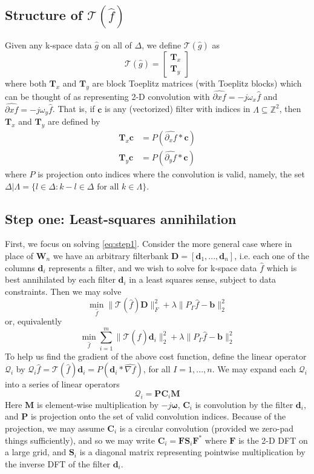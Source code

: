 \documentclass[a4paper]{article}
\begin{document}
\subsection{Structure of $\mathcal{T}(\hat f)$}
Given any k-space data $\hat g$ on all of $\Delta$, we define $\mathcal{T}(\hat g)$ as
\[
\mathcal{T}(\hat g) = \begin{bmatrix}\mathbf T_x \\ \mathbf T_y\end{bmatrix}
\]
where both $\mathbf T_x$ and $\mathbf T_y$ are block Toeplitz matrices (with Toeplitz blocks) which can be thought of as representing 2-D convolution with $\widehat{\partial x f} = -j\omega_x \hat f$ and $\widehat{\partial x f} = -j\omega_y \hat f$. That is, if $\mathbf c$ is any (vectorized) filter with indices in $\Lambda \subseteq \mathbb{Z}^2$, then $\mathbf T_x$ and $\mathbf T_y$ are defined by
\begin{align*}
\mathbf T_x \mathbf c & = P(\widehat{\partial_x f} \ast \mathbf c)\\
\mathbf T_y \mathbf c & = P(\widehat{\partial_y f} \ast \mathbf c)
\end{align*}
where $P$ is projection onto indices where the convolution is valid, namely, the set $\Delta|\Lambda =\{l \in \Delta: k-l \in \Delta \text{ for all } k \in \Lambda\}$.

\subsection{Step one: Least-squares annihilation}
First, we focus on solving \eqref{eq:step1}. Consider the more general case where in place of $\mathbf W_n$ we have an arbitrary filterbank $\mathbf D = [\mathbf d_1,...,\mathbf d_n]$, i.e. each one of the columns $\mathbf d_i$ represents a filter, and we wish to solve for k-space data $\hat f$ which is best annihilated by each filter $\mathbf d_i$ in a least squares sense, subject to data constraints. Then we may solve
\[
\min_{\hat f} \|\mathcal{T}(\hat f) \mathbf D\|_F^2 + \lambda\|P_{\Gamma} \hat f - \mathbf b\|_2^2
\]
or, equivalently
\[
\min_{\hat f} \sum_{i=1}^m\|\mathcal{T}(\hat f) \mathbf d_i \|_2^2 + \lambda\|P_{\Gamma} \hat f - \mathbf b\|_2^2
\]
To help us find the gradient of the above cost function, define the linear operator $\mathcal{Q}_i$ by $\mathcal{Q}_i \hat f = \mathcal{T}(\hat f)\mathbf d_i = P(\mathbf d_i \ast \widehat{\nabla f})$, for all $I=1,...,n$. We may expand each $\mathcal{Q}_i$ into a series of linear operators 
\[
\mathcal{Q}_i = \mathbf P \mathbf C_i \mathbf M
\]
Here $\mathbf M$ is element-wise multiplication by $-j\boldsymbol\omega$, $ \mathbf C_i$ is convolution by the filter $\mathbf d_i$, and $\mathbf P$ is projection onto the set of valid convolution indices. Because of the projection, we may assume $\mathbf C_i$ is a circular convolution (provided we zero-pad things sufficiently), and so we may write $\mathbf C_i = \mathbf F \mathbf S_i \mathbf F^*$ where $\mathbf F$ is the 2-D DFT on a large grid, and $\mathbf S_i$ is a diagonal matrix representing pointwise multiplication by the inverse DFT of the filter $\mathbf d_i$. 
\end{document}
